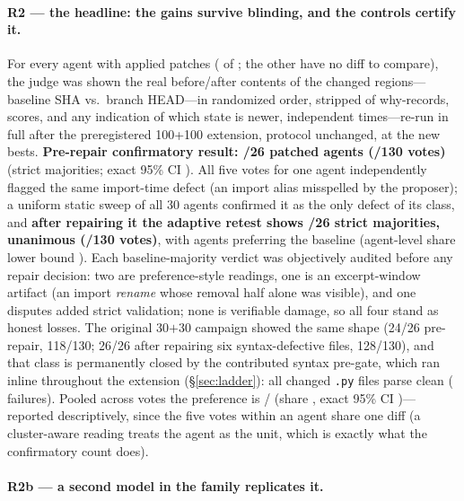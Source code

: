 \documentclass[11pt]{article}
\begin{document}
\paragraph{R2 --- the headline: the gains survive blinding, and the controls certify it.}
For every agent with applied patches (\swBlindAgents{} of \swN; the other
\swNoSource{} have no diff to compare), the judge was shown the real
before/after contents of the changed regions---baseline SHA vs.\ branch
HEAD---in randomized order, stripped of why-records, scores, and any indication
of which state is newer, \swBlindK{} independent times---re-run in full
after the preregistered 100+100 extension, protocol unchanged, at the new
bests. \textbf{Pre-repair confirmatory result: \swBlindPreMajP/26 patched
agents (\swBlindPreVotesP/130 votes)} (strict majorities; exact 95\% CI
\swBlindPreCI). All five votes for one agent independently flagged the same
import-time defect (an import alias misspelled by the proposer); a uniform
static sweep of all 30 agents confirmed it as the only defect of its class,
and \textbf{after repairing it the adaptive retest shows \swBlindMajP/26
strict majorities, \swBlindPerfect{} unanimous (\swBlindVotesP/130 votes)},
with \swBlindMajB{} agents preferring the baseline (agent-level share lower
bound \swBlindPostCIlo). Each baseline-majority verdict was objectively
audited before any repair decision: two are preference-style readings, one
is an excerpt-window artifact (an import \emph{rename} whose removal half
alone was visible), and one disputes added strict validation; none is
verifiable damage, so all four stand as honest losses. The original
30$+$30 campaign showed the same shape (24/26 pre-repair, 118/130; 26/26
after repairing six syntax-defective files, 128/130), and that class is
permanently closed by the contributed syntax pre-gate, which ran inline
throughout the extension (\S\ref{sec:ladder}): all \swSynExtChanged{}
changed \texttt{.py} files parse clean (\swSynExtFail{} failures). Pooled across
votes the preference is \swBlindVotesP/\swBlindVotesN{} (share \swBlindShare,
exact 95\% CI \swBlindShareCI)---reported descriptively, since the five votes
within an agent share one diff (a cluster-aware reading treats the agent as the
unit, which is exactly what the confirmatory count does).

\paragraph{R2b --- a second model in the family replicates it.}
\TERRApara
\end{document}
